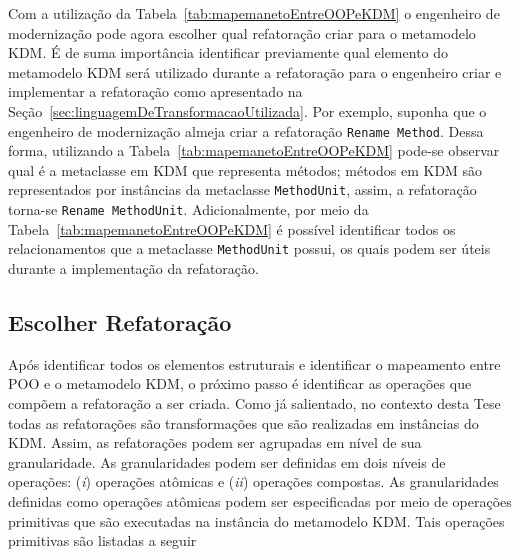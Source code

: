 Com a utilização da Tabela~\ref{tab:mapemanetoEntreOOPeKDM} o engenheiro de modernização pode agora escolher qual refatoração criar para o metamodelo KDM. É de suma importância identificar previamente qual elemento do metamodelo KDM será utilizado durante a refatoração para o engenheiro criar e implementar a refatoração como apresentado na Seção~\ref{sec:linguagemDeTransformacaoUtilizada}. Por exemplo, suponha que o engenheiro de modernização almeja criar a refatoração \texttt{Rename Method}. Dessa forma, utilizando a Tabela~\ref{tab:mapemanetoEntreOOPeKDM} pode-se observar qual é a metaclasse em KDM que representa métodos; métodos em KDM são representados por instâncias da metaclasse \texttt{MethodUnit}, assim, a refatoração torna-se \texttt{Rename MethodUnit}. Adicionalmente, por meio da Tabela~\ref{tab:mapemanetoEntreOOPeKDM} é possível identificar todos os relacionamentos que a metaclasse \texttt{MethodUnit} possui, os quais podem ser úteis durante a implementação da refatoração.


\subsection{Escolher Refatoração}\label{sec:refatoracao_para_o_metamodelo_kdm}

Após identificar todos os elementos estruturais e identificar o mapeamento entre POO e o metamodelo KDM, o próximo passo é identificar as operações que compõem a refatoração a ser criada. Como já salientado, no contexto desta Tese todas as refatorações são transformações que são realizadas em instâncias do KDM. Assim, as refatorações podem ser agrupadas em nível de sua granularidade. As granularidades podem ser definidas em dois níveis de operações: (\textit{i}) operações atômicas e (\textit{ii}) operações compostas. As granularidades definidas como operações atômicas podem ser especificadas por meio de operações primitivas que são executadas na instância do metamodelo KDM. Tais operações primitivas são listadas a seguir




